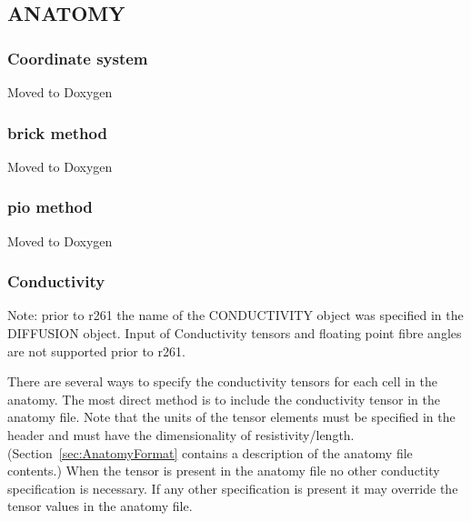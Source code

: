 \documentclass{article}
\begin{document}
\newenvironment{keywords}
{
  \par\vspace{12pt}\noindent
  \begin{tabular}{|r|p{0.7\textwidth}|}
    \hline
    Keyword & Description \\ \hline
  }
  {
  \end{tabular}\par
}

\def\kw#1#2#3{%
  #1 & {#2 \par Default: #3}\\ \hline%
}


\subsection{ANATOMY}

\subsubsection{Coordinate system}

Moved to Doxygen

\subsubsection{brick method}

Moved to Doxygen

\subsubsection{pio method}

Moved to Doxygen
 

\subsubsection{Conductivity}
Note: prior to r261 the name of the CONDUCTIVITY object was specified in
the DIFFUSION object.  Input of Conductivity tensors and floating point
fibre angles are not supported prior to r261.

There are several ways to specify the conductivity tensors for each cell
in the anatomy.  The most direct method is to include the conductivity
tensor in the anatomy file.  Note that the units of the tensor elements
must be specified in the header and must have the dimensionality of
resistivity/length.  (Section~\ref{sec:AnatomyFormat} contains a description
of the anatomy file contents.)  When the tensor is present in the
anatomy file no other conductity specification is necessary.  If any
other specification is present it may override the tensor values in the
anatomy file.
\end{document}
